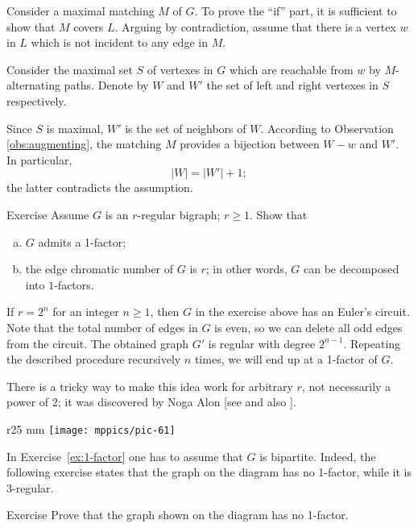 Consider a maximal matching $M$ of $G$.
To prove the ``if'' part, it is sufficient to show that $M$ covers $L$.
Arguing by contradiction, assume that there is a vertex $w$ in $L$ which is not incident to any edge in $M$.

Consider the maximal set $S$ of vertexes in $G$ which are reachable from $w$ by 
$M$-alternating paths.
Denote by $W$ and $W'$ the set of left and right vertexes in $S$ respectively.

Since $S$ is maximal, $W'$ is the set of neighbors of $W$. 
According to Observation \ref{obs:augmenting}, the matching $M$ provides a bijection between $W-w$ and $W'$.
In particular, 
\[|W|=|W'|+1;\] 
the latter contradicts the assumption.
\qeds

\begin{thm}{Exercise}\label{ex:1-factor}
Assume $G$ is an $r$-regular bigraph; $r\ge 1$.
Show that 
\begin{enumerate}[(a)]
\item $G$ admits a 1-factor;
\item the edge chromatic number of $G$ is $r$; in other words, $G$ can be decomposed into $1$-factors.
\end{enumerate}

\end{thm}

If $r=2^n$ for an integer $n\ge 1$, then $G$ in the exercise above has an Euler's circuit. 
Note that the total number of edges in $G$ is even, so we can delete all odd edges from the circuit.
The obtained graph $G'$ is regular with degree $2^{n-1}$.
Repeating the described procedure recursively $n$ times, 
we will end up at a 1-factor of $G$.

There is a tricky way to make this idea work for arbitrary $r$, not necessarily a power of $2$; 
it was discovered by Noga Alon [see  and also ]. 

\medskip

{

\begin{wrapfigure}{r}{25 mm}
\vskip-6mm
\centering
\texttt{[image: mppics/pic-61]}
\vskip-0mm
\end{wrapfigure}

In Exercise~\ref{ex:1-factor} one has to assume that $G$ is bipartite.
Indeed, the following exercise states that the graph on the diagram has no 1-factor,
while it is 3-regular.

\begin{thm}{Exercise}
Prove that the graph shown on the diagram has no 1-factor.
\end{thm}

}

